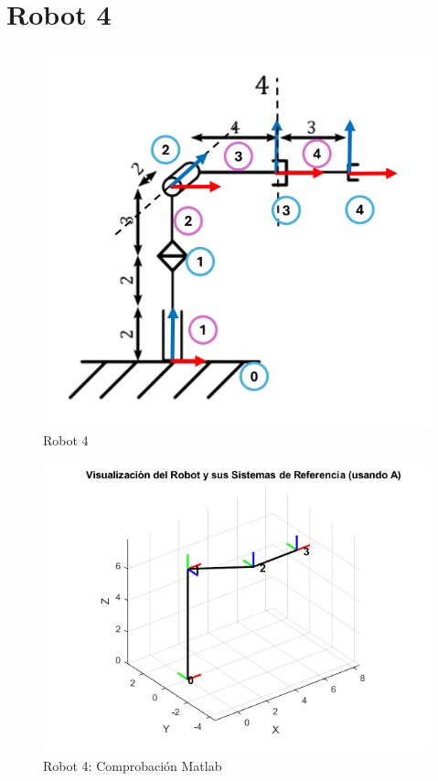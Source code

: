 \section{Robot 4}
\begin{figure}[h]
	\centering
	{%
		\includegraphics[width=0.7\linewidth]{img/Robot4_1}
		\caption{Robot 4}
		\label{fig:robot41}
	}
\end{figure}
\begin{figure}[h]
	\centering
	{%
		\includegraphics[width=0.7\linewidth]{img/Robot4}
		\caption{Robot 4: Comprobación Matlab}
		\label{fig:robot4}
	}
\end{figure}
